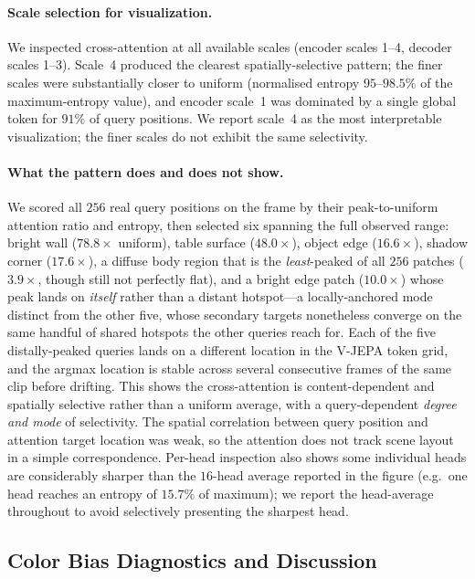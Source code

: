 \paragraph{Scale selection for visualization.} We inspected cross-attention at all available scales (encoder scales 1--4, decoder scales 1--3). Scale~4 produced the clearest spatially-selective pattern; the finer scales were substantially closer to uniform (normalised entropy $95$--$98.5\%$ of the maximum-entropy value), and encoder scale~1 was dominated by a single global token for $91\%$ of query positions. We report scale~4 as the most interpretable visualization; the finer scales do not exhibit the same selectivity.

\paragraph{What the pattern does and does not show.} We scored all $256$ real query positions on the frame by their peak-to-uniform attention ratio and entropy, then selected six spanning the full observed range: bright wall ($78.8\times$ uniform), table surface ($48.0\times$), object edge ($16.6\times$), shadow corner ($17.6\times$), a diffuse body region that is the \emph{least}-peaked of all $256$ patches ($3.9\times$, though still not perfectly flat), and a bright edge patch ($10.0\times$) whose peak lands on \emph{itself} rather than a distant hotspot---a locally-anchored mode distinct from the other five, whose secondary targets nonetheless converge on the same handful of shared hotspots the other queries reach for. Each of the five distally-peaked queries lands on a different location in the V-JEPA token grid, and the argmax location is stable across several consecutive frames of the same clip before drifting. This shows the cross-attention is content-dependent and spatially selective rather than a uniform average, with a query-dependent \emph{degree and mode} of selectivity. The spatial correlation between query position and attention target location was weak, so the attention does not track scene layout in a simple correspondence. Per-head inspection also shows some individual heads are considerably sharper than the $16$-head average reported in the figure (e.g.\ one head reaches an entropy of $15.7\%$ of maximum); we report the head-average throughout to avoid selectively presenting the sharpest head.


\subsection{Color Bias Diagnostics and Discussion}\label{app:color_bias}


